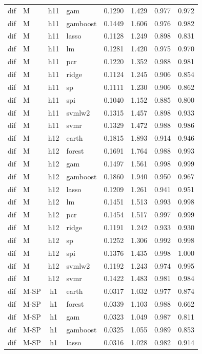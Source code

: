 \begin{ThreePartTable}
\begin{longtable}[t]{llclcccc}
dif & M & h11 & gam & 0.1290 & 1.429 & 0.977 & 0.972\\
dif & M & h11 & gamboost & 0.1449 & 1.606 & 0.976 & 0.982\\
dif & M & h11 & lasso & 0.1128 & 1.249 & 0.898 & 0.831\\
dif & M & h11 & lm & 0.1281 & 1.420 & 0.975 & 0.970\\
dif & M & h11 & pcr & 0.1220 & 1.352 & 0.988 & 0.981\\
dif & M & h11 & ridge & 0.1124 & 1.245 & 0.906 & 0.854\\
dif & M & h11 & sp & 0.1111 & 1.230 & 0.906 & 0.862\\
dif & M & h11 & spi & 0.1040 & 1.152 & 0.885 & 0.800\\
dif & M & h11 & svmlw2 & 0.1315 & 1.457 & 0.898 & 0.933\\
dif & M & h11 & svmr & 0.1329 & 1.472 & 0.988 & 0.986\\
\addlinespace
dif & M & h12 & earth & 0.1815 & 1.893 & 0.914 & 0.946\\
dif & M & h12 & forest & 0.1691 & 1.764 & 0.988 & 0.993\\
dif & M & h12 & gam & 0.1497 & 1.561 & 0.998 & 0.999\\
dif & M & h12 & gamboost & 0.1860 & 1.940 & 0.950 & 0.967\\
dif & M & h12 & lasso & 0.1209 & 1.261 & 0.941 & 0.951\\
dif & M & h12 & lm & 0.1451 & 1.513 & 0.993 & 0.998\\
dif & M & h12 & pcr & 0.1454 & 1.517 & 0.997 & 0.999\\
dif & M & h12 & ridge & 0.1191 & 1.242 & 0.933 & 0.930\\
dif & M & h12 & sp & 0.1252 & 1.306 & 0.992 & 0.998\\
dif & M & h12 & spi & 0.1376 & 1.435 & 0.998 & 1.000\\
dif & M & h12 & svmlw2 & 0.1192 & 1.243 & 0.974 & 0.995\\
dif & M & h12 & svmr & 0.1422 & 1.483 & 0.981 & 0.984\\
\addlinespace
dif & M-SP & h1 & earth & 0.0317 & 1.032 & 0.977 & 0.874\\
dif & M-SP & h1 & forest & 0.0339 & 1.103 & 0.988 & 0.662\\
dif & M-SP & h1 & gam & 0.0323 & 1.049 & 0.987 & 0.811\\
dif & M-SP & h1 & gamboost & 0.0325 & 1.055 & 0.989 & 0.853\\
dif & M-SP & h1 & lasso & 0.0316 & 1.028 & 0.982 & 0.914\\

\end{longtable}
\end{ThreePartTable}
